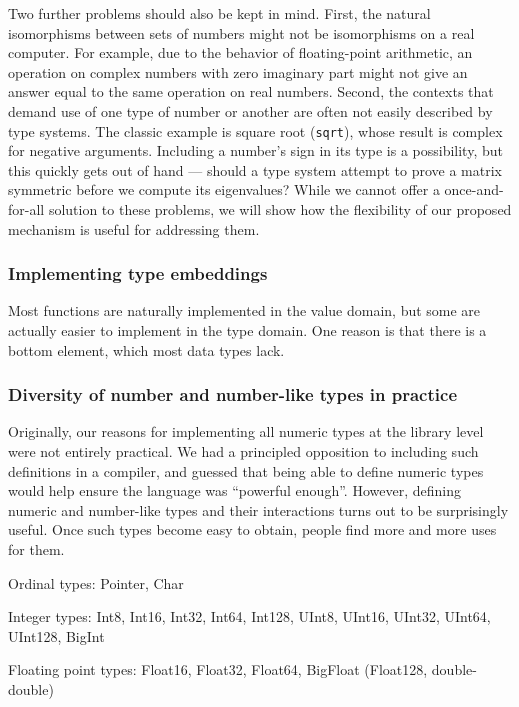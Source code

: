 Two further problems should also be kept in mind. First, the natural isomorphisms
between sets of numbers might not be isomorphisms on a real computer. For example,
due to the behavior of floating-point arithmetic, an operation on complex numbers
with zero imaginary part might not give an answer equal to the same operation on
real numbers. Second, the contexts that demand use of one type of number or
another are often not easily described by type systems. The classic example is
square root (\texttt{sqrt}), whose result is complex for negative arguments.
Including a number's sign in its type is a possibility, but this quickly gets
out of hand --- should a type system attempt to prove a matrix symmetric before
we compute its eigenvalues? While we cannot offer a once-and-for-all solution
to these problems, we will show how the flexibility of our proposed mechanism
is useful for addressing them.


\subsubsection{Implementing type embeddings}

Most functions are naturally implemented in the value domain, but some are
actually easier to implement in the type domain. One reason is that there
is a bottom element, which most data types lack.

\subsubsection{Diversity of number and number-like types in practice}

Originally, our reasons for implementing all numeric types at the library
level were not entirely practical. We had a principled opposition to
including such definitions in a compiler, and guessed that being able to
define numeric types would help ensure the language was ``powerful enough''.
However, defining numeric and number-like types and their interactions turns
out to be surprisingly useful. Once such types become easy to obtain,
people find more and more uses for them.

Ordinal types: Pointer, Char

Integer types: Int8, Int16, Int32, Int64, Int128, UInt8, UInt16, UInt32, UInt64, UInt128, BigInt

Floating point types: Float16, Float32, Float64, BigFloat
(Float128, double-double)

